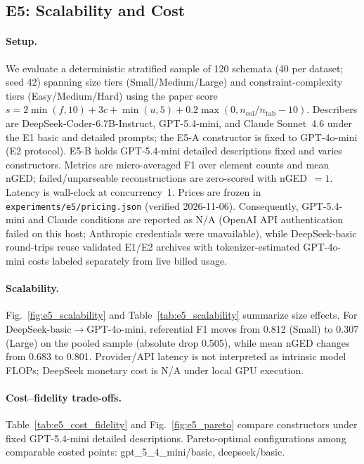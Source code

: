 \subsection{E5: Scalability and Cost}
\label{sec:e5}

\paragraph{Setup.}
We evaluate a deterministic stratified sample of 120 schemata (40 per dataset; seed 42) spanning size tiers (Small/Medium/Large) and constraint-complexity tiers (Easy/Medium/Hard) using the paper score $s=2\min(f,10)+3c+\min(u,5)+0.2\max(0,n_{\mathrm{col}}/n_{\mathrm{tab}}-10)$. Describers are DeepSeek-Coder-6.7B-Instruct, GPT-5.4-mini, and Claude Sonnet~4.6 under the E1 basic and detailed prompts; the E5-A constructor is fixed to GPT-4o-mini (E2 protocol). E5-B holds GPT-5.4-mini detailed descriptions fixed and varies constructors. Metrics are micro-averaged F1 over element counts and mean nGED; failed/unparseable reconstructions are zero-scored with nGED~$=1$. Latency is wall-clock at concurrency~1. Prices are frozen in \texttt{experiments/e5/pricing.json} (verified 2026-11-06).
 Consequently, GPT-5.4-mini and Claude conditions are reported as N/A (OpenAI API authentication failed on this host; Anthropic credentials were unavailable), while DeepSeek-basic round-trips reuse validated E1/E2 archives with tokenizer-estimated GPT-4o-mini costs labeled separately from live billed usage.

\paragraph{Scalability.}
Fig.~\ref{fig:e5_scalability} and Table~\ref{tab:e5_scalability} summarize size effects. For DeepSeek-basic$\rightarrow$GPT-4o-mini, referential F1 moves from 0.812 (Small) to 0.307 (Large) on the pooled sample (absolute drop 0.505), while mean nGED changes from 0.683 to 0.801. Provider/API latency is not interpreted as intrinsic model FLOPs; DeepSeek monetary cost is N/A under local GPU execution.

\paragraph{Cost--fidelity trade-offs.}
Table~\ref{tab:e5_cost_fidelity} and Fig.~\ref{fig:e5_pareto} compare constructors under fixed GPT-5.4-mini detailed descriptions. 
Pareto-optimal configurations among comparable costed points: gpt\_5\_4\_mini/basic, deepseek/basic. 

